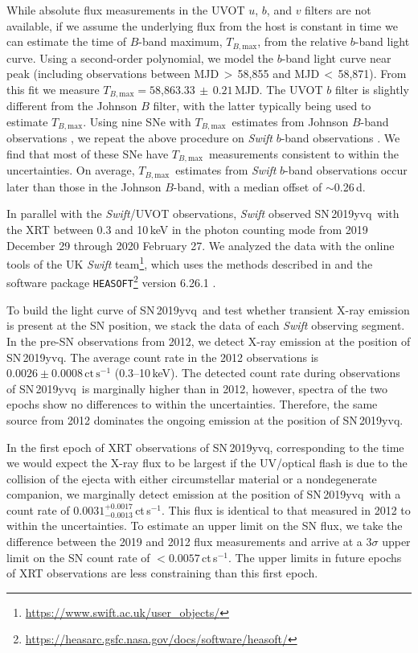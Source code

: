 \documentclass[twocolumn]{aastex63}
\newcommand{\tbmax}{$T_{B,\mathrm{max}}$}
\newcommand{\sn}{SN\,2019yvq}
\begin{document}
While absolute flux measurements in the UVOT $u$, $b$, and $v$ filters are not
available, if we assume the underlying flux from the host is constant in time
we can estimate the time of $B$-band maximum, \tbmax, from the relative
$b$-band light curve. Using a second-order polynomial, we model the $b$-band
light curve near peak (including observations between MJD$\,> \,$58,855 and
MJD$\,<\,$58,871). From this fit we measure $T_{B,\mathrm{max}} = 58$,863.33$
\,\pm \,0.21$\,MJD. The UVOT $b$ filter is slightly different from the
Johnson $B$ filter, with the latter typically being used to estimate \tbmax.
Using nine SNe with \tbmax\ estimates from Johnson $B$-band observations
\citep{Krisciunas17}, we repeat the above procedure on \textit{Swift} $b$-band
observations \citep[data from][]{Brown14}. We find that most of these SNe have
\tbmax\ measurements consistent to within the uncertainties. On average,
\tbmax\ estimates from \textit{Swift} $b$-band observations occur later than
those in the Johnson $B$-band, with a median offset of $\sim$0.26\,d.

In parallel with the \textit{Swift}/UVOT observations, \textit{Swift} observed
\sn\ with the XRT \citep{Burrows05} between 0.3 and 10\,keV in the photon
counting mode from 2019 December 29 through 2020 February 27. We analyzed the
data with the online tools of the UK \textit{Swift}
team\footnote{\href{https://www.swift.ac.uk/user_objects/}
{\url{https://www.swift.ac.uk/user_objects/}}}, which uses the methods
described in \citet{Evans07,Evans09} and the software package
\texttt{HEASOFT}\footnote{
\href{https://heasarc.gsfc.nasa.gov/docs/software/heasoft/}
{\url{https://heasarc.gsfc.nasa.gov/docs/software/heasoft/}}} version 6.26.1
\citep{Heasarc}.

To build the light curve of \sn\ and test whether transient X-ray emission is
present at the SN position, we stack the data of each \textit{Swift} observing
segment. In the pre-SN observations from 2012, we detect X-ray emission at the
position of \sn. The average count rate in the 2012 observations is
$0.0026\pm0.0008\,\mathrm{ct\,s}^{-1}$ (0.3--10\,keV). The detected count rate
during observations of \sn\ is marginally higher than in 2012, however,
spectra of the two epochs show no differences to within the uncertainties.
Therefore, the same source from 2012 dominates the ongoing emission at the
position of \sn.

In the first epoch of XRT observations of \sn, corresponding to the time we
would expect the X-ray flux to be largest if the UV/optical flash is due to
the collision of the ejecta with either circumstellar material or a
nondegenerate companion, we marginally detect emission at the position of \sn\
with a count rate of $0.0031^{+0.0017}_{-0.0013}$\,ct\,s$^{-1}$. This flux is
identical to that measured in 2012 to within the uncertainties. To estimate an
upper limit on the SN flux, we take the difference between the 2019 and 2012
flux measurements and arrive at a $3\sigma$ upper limit on the SN count rate
of $< 0.0057$\,ct\,s$^{-1}$. The upper limits in future epochs of XRT
observations are less constraining than this first epoch.
 
\end{document}
